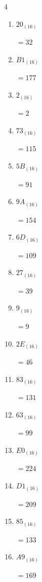\begin{multicols}{4}
\begin{enumerate}
  \item $20_{(16)}$

        $=32$

\columnbreak %

\resetques

  \item $B1_{(16)}$

        $=177$

  \item $2_{(16)}$

        $=2$

  \item $73_{(16)}$

        $=115$

  \item $5B_{(16)}$

        $=91$

  \item $9A_{(16)}$

        $=154$

  \item $6D_{(16)}$

        $=109$

  \item $27_{(16)}$

        $=39$

  \item $9_{(16)}$

        $=9$

  \item $2E_{(16)}$

        $=46$

  \item $83_{(16)}$

        $=131$

  \item $63_{(16)}$

        $=99$

  \item $E0_{(16)}$

        $=224$

  \item $D1_{(16)}$

        $=209$

  \item $85_{(16)}$

        $=133$

  \item $A9_{(16)}$

        $=169$


\end{enumerate}
\end{multicols}
